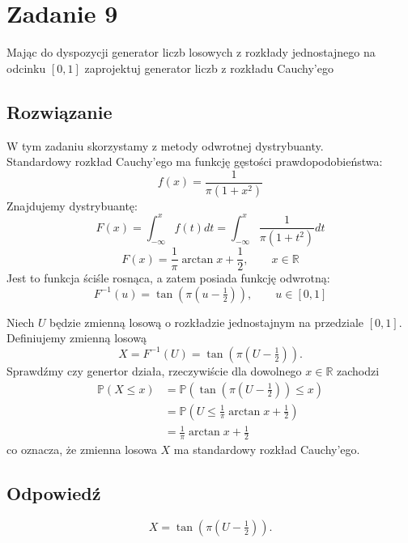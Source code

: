 \section{Zadanie 9}
Mając do dyspozycji generator liczb losowych z rozkłady jednostajnego na odcinku \([0,1]\)
zaprojektuj generator liczb z rozkładu Cauchy'ego

\subsection*{Rozwiązanie}
W tym zadaniu skorzystamy z metody odwrotnej dystrybuanty.\\
Standardowy rozkład Cauchy'ego ma funkcję gęstości prawdopodobieństwa:
\[ f(x) = \frac{1}{\pi(1+x^2)} \]
Znajdujemy dystrybuantę:
\[ F(x) = \int_{-\infty}^{x}f(t)dt = \int_{-\infty}^{x}\frac{1}{\pi(1+t^2)}dt \]
\[ F(x) = \frac{1}{\pi}\arctan x + \frac{1}{2}, \qquad x \in \mathbb{R} \]
Jest to funkcja ściśle rosnąca, a zatem posiada funkcję odwrotną:
\[ F^{-1}(u) = \tan\!\left(\pi(u - \tfrac{1}{2})\right), \qquad u \in [0,1] \]

Niech \(U\) będzie zmienną losową o rozkładzie jednostajnym na przedziale \([0,1]\).
Definiujemy zmienną losową
\[
	X = F^{-1}(U) = \tan\!\left(\pi(U - \tfrac{1}{2})\right).
\]
Sprawdźmy czy genertor działa, rzeczywiście dla dowolnego \(x \in \mathbb{R}\) zachodzi
\[
	\begin{aligned}
		\mathbb{P}(X \le x)
		 & = \mathbb{P}\!\left( \tan\!\left(\pi(U - \tfrac{1}{2})\right) \le x \right) \\
		 & = \mathbb{P}\!\left( U \le \frac{1}{\pi}\arctan x + \frac{1}{2} \right)     \\
		 & = \frac{1}{\pi}\arctan x + \frac{1}{2}
	\end{aligned}
\]
co oznacza, że zmienna losowa \(X\) ma standardowy rozkład Cauchy'ego. \\



\subsection*{Odpowiedź}
\[
	\boxed{X = \tan\!\left(\pi(U - \tfrac{1}{2})\right).}
\]
